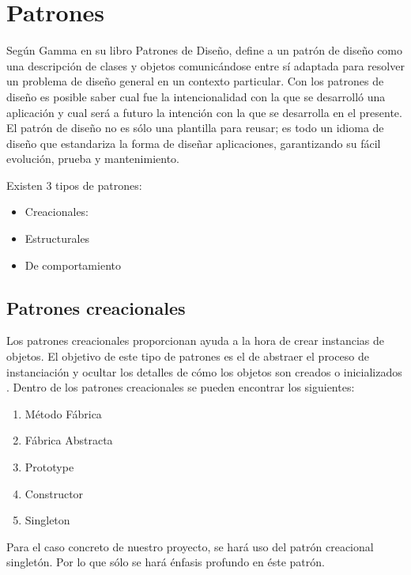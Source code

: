 \newpage

\section{Patrones}
Según Gamma en su libro Patrones de Diseño, define a un patrón de diseño como una descripción
de clases y objetos comunicándose
entre sí adaptada para resolver un
problema de diseño general en un
contexto particular. Con los patrones de diseño es posible saber cual fue la intencionalidad con la que se desarrolló una aplicación y cual será a futuro la intención con la que se desarrolla en el presente. El patrón de diseño no es sólo una plantilla para reusar; es todo un idioma de diseño que estandariza la forma de diseñar aplicaciones, garantizando su fácil evolución, prueba y mantenimiento\cite{Bol_2014}.

Existen 3 tipos de patrones:
\begin{itemize}
\item Creacionales: 
\item Estructurales
\item De comportamiento
\end{itemize}
\subsection{Patrones creacionales}
Los patrones creacionales proporcionan ayuda a la hora de crear instancias de objetos. El objetivo
de este tipo de patrones es el de abstraer el proceso de instanciación y ocultar los detalles de cómo los objetos
son creados o inicializados \cite{Bol_2014}.
Dentro de los patrones creacionales se pueden encontrar los siguientes:
\begin{enumerate}
\item Método Fábrica
\item Fábrica Abstracta
\item Prototype
\item Constructor
\item Singleton
\end{enumerate}

Para el caso concreto de nuestro proyecto, se hará uso del patrón creacional singletón. Por lo que sólo se hará énfasis profundo en éste patrón.
\newpage
